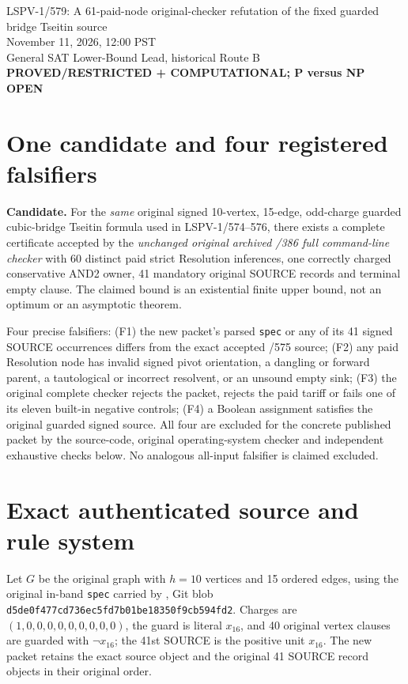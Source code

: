 \documentclass[11pt]{article}
\begin{document}
\begin{center}
{\Large LSPV-1/579: A 61-paid-node original-checker refutation of the fixed guarded bridge Tseitin source}\\[5pt]
November 11, 2026, 12:00 PST\\
General SAT Lower-Bound Lead, historical Route B\\
\textbf{PROVED/RESTRICTED + COMPUTATIONAL; P versus NP OPEN}
\end{center}

\section*{One candidate and four registered falsifiers}
\textbf{Candidate.} For the \emph{same} original signed 10-vertex, 15-edge, odd-charge guarded cubic-bridge Tseitin formula used in LSPV-1/574--576, there exists a complete certificate accepted by the \emph{unchanged original archived /386 full command-line checker} with 60 distinct paid strict Resolution inferences, one correctly charged conservative AND2 owner, 41 mandatory original SOURCE records and terminal empty clause. The claimed bound is an existential finite upper bound, not an optimum or an asymptotic theorem.

Four precise falsifiers: (F1) the new packet's parsed \texttt{spec} or any of its 41 signed SOURCE occurrences differs from the exact accepted /575 source; (F2) any paid Resolution node has invalid signed pivot orientation, a dangling or forward parent, a tautological or incorrect resolvent, or an unsound empty sink; (F3) the original complete checker rejects the packet, rejects the paid tariff or fails one of its eleven built-in negative controls; (F4) a Boolean assignment satisfies the original guarded signed source. All four are excluded for the concrete published packet by the source-code, original operating-system checker and independent exhaustive checks below. No analogous all-input falsifier is claimed excluded.

\section*{Exact authenticated source and rule system}
Let $G$ be the original graph with $h=10$ vertices and 15 ordered edges, using the original in-band \texttt{spec} carried by , Git blob \texttt{d5de0f477cd736ec5fd7b01be18350f9cb594fd2}. Charges are $(1,0,0,0,0,0,0,0,0,0)$, the guard is literal $x_{16}$, and 40 original vertex clauses are guarded with $\neg x_{16}$; the 41st SOURCE is the positive unit $x_{16}$. The new packet retains the exact source object and the original 41 SOURCE record objects in their original order.
\end{document}
